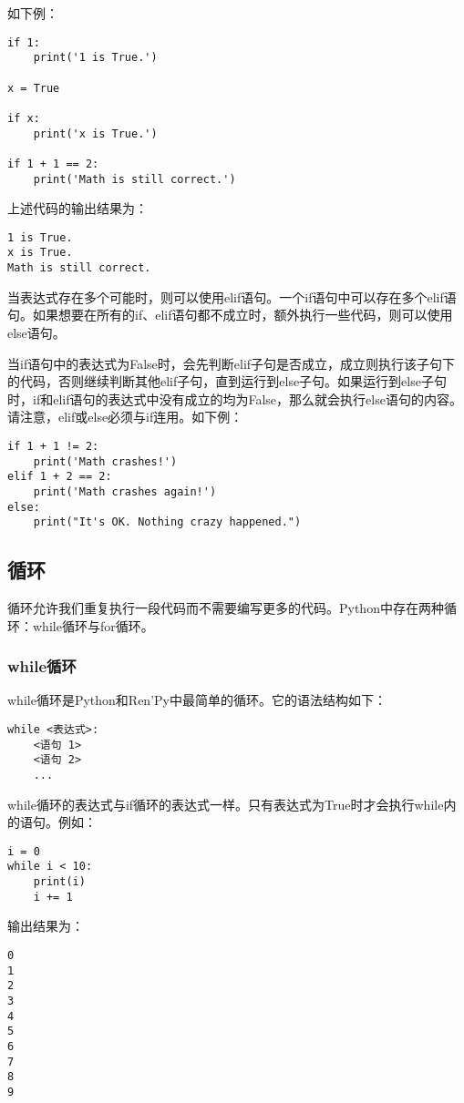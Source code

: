 如下例：

\begin{lstlisting}
if 1:
    print('1 is True.')

x = True

if x:
    print('x is True.')

if 1 + 1 == 2:
    print('Math is still correct.')
\end{lstlisting}

上述代码的输出结果为：
\begin{lstlisting}
1 is True.
x is True.
Math is still correct.
\end{lstlisting}

当表达式存在多个可能时，则可以使用elif语句。一个if语句中可以存在多个elif语句。如果想要在所有的if、elif语句都不成立时，额外执行一些代码，则可以使用else语句。

当if语句中的表达式为False时，会先判断elif子句是否成立，成立则执行该子句下的代码，否则继续判断其他elif子句，直到运行到else子句。如果运行到else子句时，if和elif语句的表达式中没有成立的均为False，那么就会执行else语句的内容。请注意，elif或else必须与if连用。如下例：

\begin{lstlisting}
if 1 + 1 != 2:
    print('Math crashes!')
elif 1 + 2 == 2:
    print('Math crashes again!')
else:
    print("It's OK. Nothing crazy happened.")
\end{lstlisting}

\subsection{循环}
循环允许我们重复执行一段代码而不需要编写更多的代码。Python中存在两种循环：while循环与for循环。

\subsubsection{while循环}
while循环是Python和Ren'Py中最简单的循环。它的语法结构如下：
\begin{lstlisting}
while <表达式>:
    <语句 1>
    <语句 2>
    ...
\end{lstlisting}

while循环的表达式与if循环的表达式一样。只有表达式为True时才会执行while内的语句。例如：

\begin{lstlisting}
i = 0
while i < 10:
    print(i)
    i += 1
\end{lstlisting}

输出结果为：
\begin{lstlisting}
0
1
2
3
4
5
6
7
8
9
\end{lstlisting}

